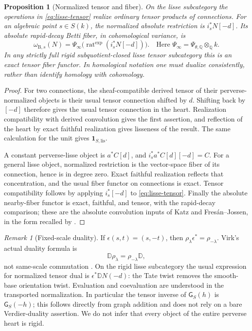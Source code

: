 \documentclass[11pt]{article}
\numberwithin{equation}{section}
\newtheorem{proposition}[proposition]{Proposition}
\theoremstyle{definition}
\theoremstyle{remark}
\newtheorem{remark}[remark]{Remark}
\newcommand{\Q}{\mathbb Q}
\newcommand{\rat}{\operatorname{rat}}
\newcommand{\B}{\mathrm B}
\newcommand{\lis}{\mathrm{lis}}
\newcommand{\one}{\mathbf1}
\newcommand{\DD}{\mathbb D}
\begin{document}
\begin{proposition}[Normalized tensor and fiber]\label{prop:normalization}\label{prop:absolute-rd-input}
On the lisse subcategory the operations in \eqref{eq:lisse-tensor} realize
ordinary tensor products of connections. For an algebraic point $s\in S(k)$,
the normalized absolute restriction is $i_s^*N[-d]$. Its absolute
rapid-decay Betti fiber, in cohomological variance, is
\begin{equation}\label{eq:betti-fiber}
  \omega_{\B,s}(N)
  =\Psi_\infty\bigl(\rat^{\exp}(i_s^*N[-d])\bigr).
  \quad\text{Here }\Psi_\infty=\Psi_{\theta,\Q}\otimes_\Q k.
\end{equation}
In any strictly full rigid subquotient-closed lisse tensor subcategory this
is an exact tensor fiber functor. In homological notation one must dualize
consistently, rather than identify homology with cohomology.
\end{proposition}
\begin{proof}
For two connections, the sheaf-compatible derived tensor of their
perverse-normalized objects is their usual tensor connection shifted by
$d$. Shifting back by $[-d]$ therefore gives the usual tensor connection
in the heart. Realization compatibility with derived convolution gives the
first assertion, and reflection of the heart by exact faithful realization
gives lisseness of the result. The same calculation for the unit gives
$\one_{S,\lis}$.

A constant perverse-lisse object is $a^*C[d]$, and
$i_s^*a^*C[d][-d]=C$. For a general lisse object, normalized restriction
is the vector-space fiber of its connection, hence is in degree zero.
Exact faithful realization reflects that concentration, and the usual
fiber functor on connections is exact. Tensor compatibility follows by
applying $i_s^*[-d]$ to \eqref{eq:lisse-tensor}.
Finally the absolute nearby-fiber functor is exact, faithful, and tensor,
with the rapid-decay comparison; these are the absolute convolution inputs
of Katz and Fres\'an--Jossen, in the form recalled by
\cite[Corollary~2.17 and Theorem~3.6]{Snodgrass}.
\end{proof}

\begin{remark}[Fixed-scale duality]\label{rem:duality}
If $\epsilon(s,t)=(s,-t)$, then
$\rho_\lambda\epsilon^*=\rho_{-\lambda}$. Virk's actual duality formula is
\[
  \DD\rho_\lambda=\rho_{-\lambda}\DD,
\]
not same-scale commutation \cite[Theorem~6.13]{Virk}. On the rigid lisse
subcategory the usual expression for normalized tensor dual is
$\epsilon^*\DD N(-d)$: the Tate twist removes the smooth-base orientation
twist. Evaluation and coevaluation are understood in the transported
normalization. In particular the tensor inverse of $\mathsf G_S(h)$ is
$\mathsf G_S(-h)$; this follows directly from graph addition and does not
rely on a bare Verdier-duality assertion. We do not infer that every
object of the entire perverse heart is rigid.
\end{remark}
\end{document}

